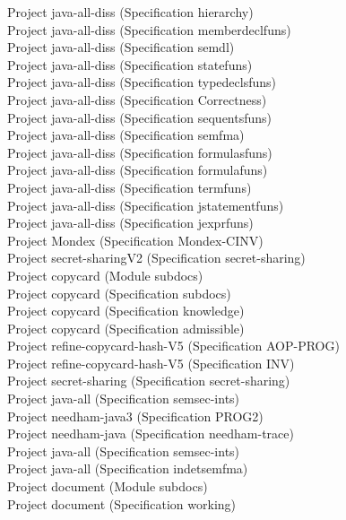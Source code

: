 \documentclass[a4paper]{article}
\begin{document}
\begin{itemize}
Project java-all-diss (Specification hierarchy) \\
Project java-all-diss (Specification memberdeclfuns) \\
Project java-all-diss (Specification semdl) \\
Project java-all-diss (Specification statefuns) \\
Project java-all-diss (Specification typedeclsfuns) \\
Project java-all-diss (Specification Correctness) \\
Project java-all-diss (Specification sequentsfuns) \\
Project java-all-diss (Specification semfma) \\
Project java-all-diss (Specification formulasfuns) \\
Project java-all-diss (Specification formulafuns) \\
Project java-all-diss (Specification termfuns) \\
Project java-all-diss (Specification jstatementfuns) \\
Project java-all-diss (Specification jexprfuns) \\
Project Mondex (Specification Mondex-CINV) \\
Project secret-sharingV2 (Specification secret-sharing) \\
Project copycard (Module subdocs) \\
Project copycard (Specification subdocs) \\
Project copycard (Specification knowledge) \\
Project copycard (Specification admissible) \\
Project refine-copycard-hash-V5 (Specification AOP-PROG) \\
Project refine-copycard-hash-V5 (Specification INV) \\
Project secret-sharing (Specification secret-sharing) \\
Project java-all (Specification semsec-ints) \\
Project needham-java3 (Specification PROG2) \\
Project needham-java (Specification needham-trace) \\
Project java-all (Specification semsec-ints) \\
Project java-all (Specification indetsemfma) \\
Project document (Module subdocs) \\
Project document (Specification working) \\

\end{itemize}
\end{document}
